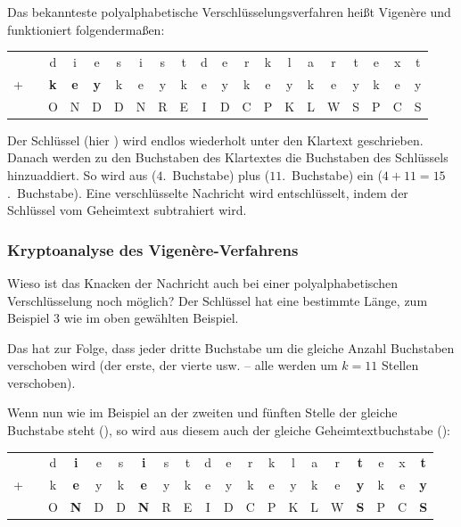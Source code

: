 Das bekannteste polyalphabetische Verschlüsselungsverfahren heißt Vigenère und
funktioniert folgendermaßen:

\bgroup
\def\arraystretch{1.2}
\setlength{\tabcolsep}{.5em}
\begin{tabular}{cccccccccccccccccccc}
  & & d & i & e & s & i & s & t & d & e & r & k & l & a & r & t & e & x & t \\
+ & & \textbf{k} & \textbf{e} & \textbf{y} & k & e & y & k & e & y & k & e & y &
k & e & y & k & e & y
\\
\hline
  & & O & N & D & D & N & R & E & I & D & C & P & K & L & W & S & P & C & S \\
\end{tabular}
\egroup   
   
Der Schlüssel (hier ) wird endlos wiederholt unter den Klartext
geschrieben. Danach werden zu den Buchstaben des Klartextes die Buchstaben des
Schlüssels hinzuaddiert. So wird aus  ($4$.~Buchstabe) plus
 ($11$.~Buchstabe) ein  ($4 + 11 = 15$.~Buchstabe).
Eine verschlüsselte Nachricht wird entschlüsselt, indem der Schlüssel vom
Geheimtext subtrahiert wird.

\subsubsection{Kryptoanalyse des Vigenère-Verfahrens}

Wieso ist das Knacken der Nachricht auch bei einer polyalphabetischen
Verschlüsselung noch möglich? Der Schlüssel hat eine bestimmte Länge, zum
Beispiel $3$ wie im oben gewählten Beispiel.

Das hat zur Folge, dass jeder dritte Buchstabe um die gleiche Anzahl Buchstaben
verschoben wird (der erste, der vierte usw. -- alle werden um $k = 11$ Stellen
verschoben).

Wenn nun wie im Beispiel an der zweiten und fünften Stelle der gleiche Buchstabe
steht (), so wird aus diesem auch der gleiche Geheimtextbuchstabe
():

\bgroup
\def\arraystretch{1.2}
\setlength{\tabcolsep}{.5em}
\begin{tabular}{cccccccccccccccccccc}
  & & d & \textbf{i} & e & s & \textbf{i} & s & t & d & e & r & k & l & a & r &
  \textbf{t} & e & x & \textbf{t}
  \\
+ & & k & \textbf{e} & y & k & \textbf{e} & y & k & e & y & k & e & y &
k & e & \textbf{y} & k & e & \textbf{y}
\\
\hline
  & & O & \textbf{N} & D & D & \textbf{N} & R & E & I & D & C & P & K & L & W &
  \textbf{S} & P & C & \textbf{S}
  \\
\end{tabular}
\egroup


